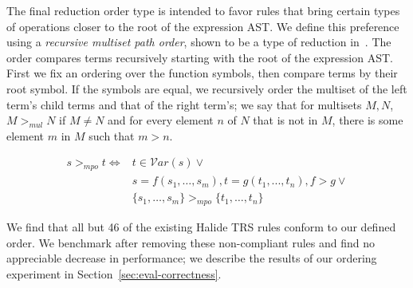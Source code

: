\documentclass[sigplan,10pt,review,anonymous]{acmart}\settopmatter{printfolios=true,printccs=false,printacmref=false}
\newcommand{\NumOrderingProblems}{{\color{black} 46}\xspace}
\begin{document}
The final reduction order type is intended to favor rules that bring certain
types of operations closer to the root of the expression AST.
We define this preference using a \emph{recursive multiset path order}, shown to be a type of reduction in~\cite{baader1999term}. The order compares terms recursively starting with the root of the expression AST. First we
fix an ordering over the function symbols, then compare terms by their root
symbol. If the symbols are equal, we recursively order the multiset of the left
term's child terms and that of the right term's; we say that for multisets $M,
N$, $M >_{mul} N$ if $M \neq N$ and for every element $n$ of $N$ that is not in
$M$, there is some element $m$ in $M$ such that $m > n$.

\begin{equation*}
\begin{split}
s >_{mpo} t \iff & t \in \mathcal{V}ar(s) \vee \\
              &  s = f(s_1,\dots,s_m), t = g(t_1,...,t_n), f > g \vee \\
               & \{s_1, \dots, s_m\} >_{mpo} \{t_1,\dots,t_n\}
\end{split}
\end{equation*}

We find that all but \NumOrderingProblems of the existing Halide TRS rules conform to our defined order. We benchmark after removing these non-compliant rules and find no appreciable decrease in performance; we describe the results of our ordering experiment in Section~\ref{sec:eval-correctness}.
\end{document}
